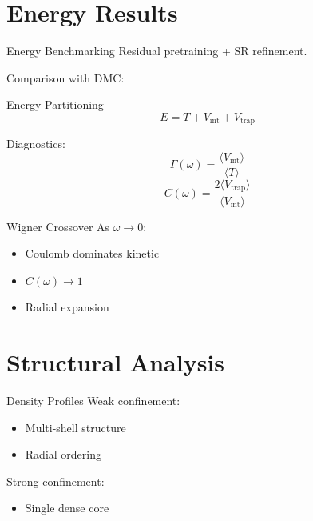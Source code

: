 \documentclass{beamer}
\begin{document}
\section{Energy Results}

\begin{frame}{Energy Benchmarking}
Residual pretraining + SR refinement.

Comparison with DMC:

\centering
{}
\end{frame}

\begin{frame}{Energy Partitioning}
\[
E = T + V_{\text{int}} + V_{\text{trap}}
\]

Diagnostics:
\[
\Gamma(\omega) = \frac{\langle V_{\text{int}}\rangle}{\langle T\rangle}
\]
\[
C(\omega)=\frac{2\langle V_{\text{trap}}\rangle}{\langle V_{\text{int}}\rangle}
\]
\end{frame}

\begin{frame}{Wigner Crossover}
As $\omega \to 0$:
\begin{itemize}
\item Coulomb dominates kinetic
\item $C(\omega)\to 1$
\item Radial expansion
\end{itemize}

\centering
{}
\end{frame}

\section{Structural Analysis}

\begin{frame}{Density Profiles}
Weak confinement:
\begin{itemize}
\item Multi-shell structure
\item Radial ordering
\end{itemize}

Strong confinement:
\begin{itemize}
\item Single dense core
\end{itemize}

\centering
{}
\end{frame}
\end{document}
